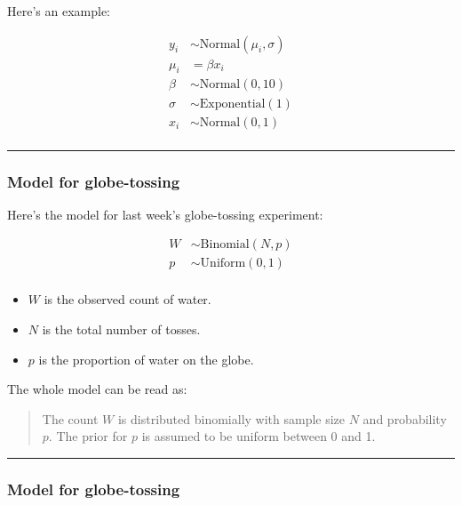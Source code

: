 \documentclass[
  letterpaper,
  DIV=11,
  numbers=noendperiod]{scrartcl}
\providecommand{\tightlist}{%
  \setlength{\itemsep}{0pt}\setlength{\parskip}{0pt}}\usepackage{longtable,booktabs,array}
\begin{document}
Here's an example:

\begin{align*}
y_i &\sim \text{Normal}(\mu_i,\sigma) \\
\mu_i &= \beta x_i \\
\beta &\sim \text{Normal}(0,10) \\
\sigma &\sim \text{Exponential}(1) \\
x_i &\sim \text{Normal}(0,1) \\
\end{align*}

\begin{center}\rule{0.5\linewidth}{0.5pt}\end{center}

\subsubsection{Model for globe-tossing}\label{model-for-globe-tossing}

Here's the model for last week's globe-tossing experiment:

\begin{align*}
W &\sim \text{Binomial}(N,p) \\
p &\sim \text{Uniform}(0,1) \\
\end{align*}

\begin{itemize}
\tightlist
\item
  \(W\) is the observed count of water.
\item
  \(N\) is the total number of tosses.
\item
  \(p\) is the proportion of water on the globe.
\end{itemize}

The whole model can be read as:

\begin{quote}
The count \(W\) is distributed binomially with sample size \(N\) and
probability \(p\). The prior for \(p\) is assumed to be uniform between
0 and 1.
\end{quote}

\begin{center}\rule{0.5\linewidth}{0.5pt}\end{center}

\subsubsection{Model for globe-tossing}\label{model-for-globe-tossing-1}
\end{document}
